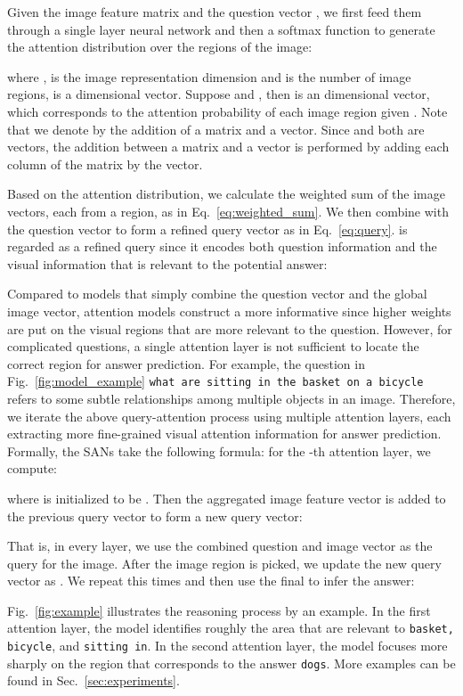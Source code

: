 \documentclass[10pt,twocolumn,letterpaper]{article}
\begin{document}
Given the image feature matrix  and the question vector , we
first feed them through a single layer neural network and then a softmax
function to generate the attention distribution over the regions of the image:

where ,  is the image representation
dimension and  is the number of image regions,  is
a  dimensional vector. Suppose 
and , then  is an 
dimensional vector, which corresponds to the attention probability of each
image region given . Note that we denote by  the addition of a
matrix and a vector. Since  and both
 are vectors, the addition between a
matrix and a vector is performed by adding each column of the matrix by the
vector.

Based on the attention distribution, we calculate the weighted sum of the image
vectors, each from a region,  as in
Eq.~\ref{eq:weighted_sum}. We then combine  with the question
vector  to form a refined query vector  as in Eq.~\ref{eq:query}. 
is regarded as a refined query since it encodes both question information and
the visual information that is relevant to the potential answer:


Compared to models that simply combine the question vector and the global image
vector, attention models construct a more informative  since higher weights
are put on the visual regions that are more relevant to the question. However,
for complicated questions, a single attention layer is not sufficient to locate
the correct region for answer prediction. For example, the question in
Fig.~\ref{fig:model_example} \texttt{what are sitting in the basket on a
  bicycle} refers to some subtle relationships among multiple objects in an
image. Therefore, we iterate the above query-attention process using multiple
attention layers, each extracting more fine-grained visual attention
information for answer prediction. Formally, the SANs take the following
formula: for the -th attention layer, we compute:

where  is initialized to be . Then the aggregated image feature
vector is added to the previous query vector to form a new query vector:


That is, in every layer, we use the combined question and image vector
 as the query for the image. After the image region is picked, we
update the new query vector as . We repeat
this  times and then use the final  to infer the answer:


Fig.~\ref{fig:example} illustrates the reasoning process by an example. In the
first attention layer, the model identifies roughly the area that are relevant
to \texttt{basket, bicycle}, and \texttt{sitting in}. In the second attention
layer, the model focuses more sharply on the region that corresponds to the
answer \texttt{dogs}. More examples can be found in Sec.~\ref{sec:experiments}.
\end{document}
